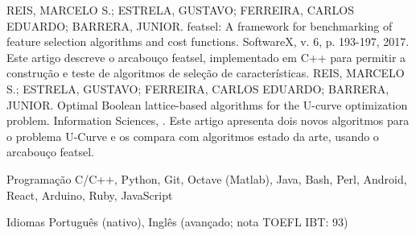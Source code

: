 \documentclass[11pt, a4paper]{awesome-cv-res}
\begin{document}
\begin{cventries}
\cventry
    {REIS, MARCELO S.; ESTRELA, GUSTAVO; FERREIRA, CARLOS EDUARDO; BARRERA, JUNIOR.}
    {featsel: A framework for benchmarking of feature selection algorithms and cost functions.}
    {SoftwareX, v. 6, p. 193-197, 2017.}
    {}
    {Este artigo descreve o arcabouço featsel, implementado em C++
    para permitir a construção e teste de algoritmos de seleção de 
    características.}
\cventry
    {REIS, MARCELO S.; ESTRELA, GUSTAVO; FERREIRA, CARLOS EDUARDO; BARRERA, JUNIOR.}
    {Optimal Boolean lattice-based algorithms for the U-curve optimization problem.}
    {Information Sciences, .}
    {}
    {Este artigo apresenta dois novos algoritmos para o problema U-Curve
    e os compara com algoritmos estado da arte, usando o arcabouço
    featsel.}
\end{cventries}

\begin{cvskills}
\cvskill
{Programação} %
{C/C++, Python, Git, Octave (Matlab), Java, Bash, Perl,
Android, React, Arduino, Ruby, JavaScript}

\cvskill
{Idiomas} %
{Português (nativo), Inglês (avançado; nota TOEFL IBT: 93)} %
\end{cvskills}
\end{document}
